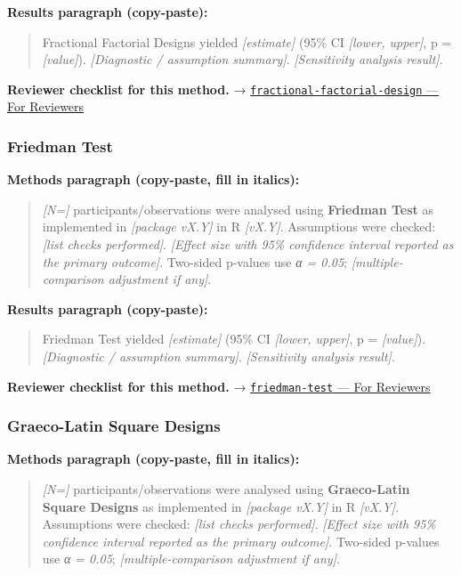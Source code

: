 \documentclass[
]{article}
\begin{document}
\textbf{Results paragraph (copy-paste):}

\begin{quote}
Fractional Factorial Designs yielded \emph{{[}estimate{]}} (95\% CI
\emph{{[}lower, upper{]}}, p = \emph{{[}value{]}}). \emph{{[}Diagnostic
/ assumption summary{]}}. \emph{{[}Sensitivity analysis result{]}}.
\end{quote}

\textbf{Reviewer checklist for this method.} →
\href{../chapters/16-design/fractional-factorial-design.Rmd\#for-reviewers}{\texttt{fractional-factorial-design}
--- For Reviewers}

\subsubsection{Friedman Test}\label{friedman-test}

\textbf{Methods paragraph (copy-paste, fill in italics):}

\begin{quote}
\emph{{[}N={]}} participants/observations were analysed using
\textbf{Friedman Test} as implemented in \emph{{[}package vX.Y{]}} in R
\emph{{[}vX.Y{]}}. Assumptions were checked: \emph{{[}list checks
performed{]}}. \emph{{[}Effect size with 95\% confidence interval
reported as the primary outcome{]}}. Two-sided p-values use \emph{α =
0.05}; \emph{{[}multiple-comparison adjustment if any{]}}.
\end{quote}

\textbf{Results paragraph (copy-paste):}

\begin{quote}
Friedman Test yielded \emph{{[}estimate{]}} (95\% CI \emph{{[}lower,
upper{]}}, p = \emph{{[}value{]}}). \emph{{[}Diagnostic / assumption
summary{]}}. \emph{{[}Sensitivity analysis result{]}}.
\end{quote}

\textbf{Reviewer checklist for this method.} →
\href{../chapters/04-inferential/friedman-test.Rmd\#for-reviewers}{\texttt{friedman-test}
--- For Reviewers}

\subsubsection{Graeco-Latin Square
Designs}\label{graeco-latin-square-designs}

\textbf{Methods paragraph (copy-paste, fill in italics):}

\begin{quote}
\emph{{[}N={]}} participants/observations were analysed using
\textbf{Graeco-Latin Square Designs} as implemented in \emph{{[}package
vX.Y{]}} in R \emph{{[}vX.Y{]}}. Assumptions were checked: \emph{{[}list
checks performed{]}}. \emph{{[}Effect size with 95\% confidence interval
reported as the primary outcome{]}}. Two-sided p-values use \emph{α =
0.05}; \emph{{[}multiple-comparison adjustment if any{]}}.
\end{quote}
\end{document}
